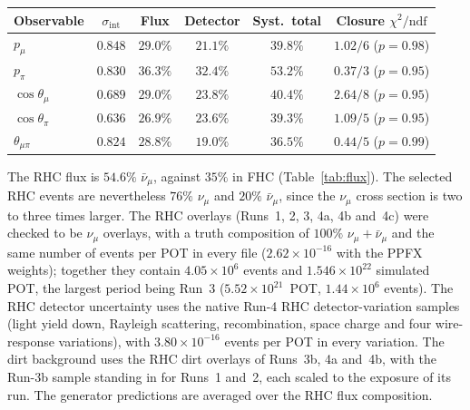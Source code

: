 \documentclass[11pt,a4paper]{article}
\begin{document}
\begin{center}\small
{}
    \label{tab:fhc}
\begin{tabular}{lccccc}
\toprule
Observable & $\sigma_\mathrm{int}$ & Flux & Detector & Syst.\ total & Closure $\chi^2/\mathrm{ndf}$ \\
\midrule
      $p_\mu$            & $0.848$ & $29.0\%$ & $21.1\%$ & $39.8\%$ & $1.02/6$ ($p=0.98$) \\
      $p_\pi$            & $0.830$ & $36.3\%$ & $32.4\%$ & $53.2\%$ & $0.37/3$ ($p=0.95$) \\
      $\cos\theta_\mu$   & $0.689$ & $29.0\%$ & $23.8\%$ & $40.4\%$ & $2.64/8$ ($p=0.95$) \\
      $\cos\theta_\pi$   & $0.636$ & $26.9\%$ & $23.6\%$ & $39.3\%$ & $1.09/5$ ($p=0.95$) \\
      $\theta_{\mu\pi}$  & $0.824$ & $28.8\%$ & $19.0\%$ & $36.5\%$ & $0.44/5$ ($p=0.99$) \\
\bottomrule
\end{tabular}
\end{center}

The RHC flux is $54.6\%$ $\bar\nu_\mu$, against $35\%$ in FHC (Table~\ref{tab:flux}). The selected
RHC events are nevertheless $76\%$ $\nu_\mu$ and $20\%$ $\bar\nu_\mu$, since the $\nu_\mu$ cross
section is two to three times larger. The RHC overlays (Runs~1, 2, 3, 4a, 4b and~4c) were checked to
be $\nu_\mu$ overlays, with a truth composition of $100\%$ $\nu_\mu+\bar\nu_\mu$ and the same number
of events per POT in every file ($2.62\times10^{-16}$ with the PPFX weights); together they contain
$4.05\times10^{6}$ events and $1.546\times10^{22}$ simulated POT, the largest period being Run~3
($5.52\times10^{21}$~POT, $1.44\times10^{6}$ events). The RHC detector uncertainty uses the native
Run-4 RHC detector-variation samples (light yield down, Rayleigh scattering, recombination, space
charge and four wire-response variations), with $3.80\times10^{-16}$ events per POT in every
variation. The dirt background uses the RHC dirt overlays of Runs~3b, 4a and~4b, with the Run-3b
sample standing in for Runs~1 and~2, each scaled to the exposure of its run.
The generator predictions are averaged over the RHC flux composition.
\end{document}
